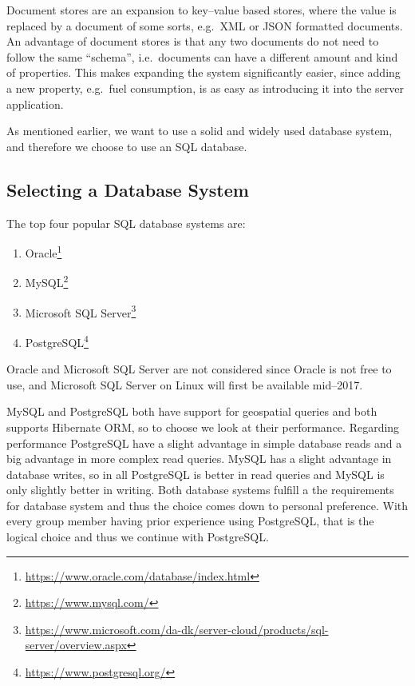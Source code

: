 Document stores are an expansion to key--value based stores, where the value is replaced by a document of some sorts, e.g.~XML or JSON formatted documents.
An advantage of document stores is that any two documents do not need to follow the same ``schema'', i.e.~documents can have a different amount and kind of properties.
This makes expanding the system significantly easier, since adding a new property, e.g.~fuel consumption, is as easy as introducing it into the server application.

\bigskip
As mentioned earlier, we want to use a solid and widely used database system, and therefore we choose to use an SQL database.

\subsection{Selecting a Database System}

The top four popular SQL database systems are\cite{DB_RANKINGS}: 
\begin{enumerate}
\item Oracle\footnote{\url{https://www.oracle.com/database/index.html}}
\item MySQL\footnote{\url{https://www.mysql.com/}}
\item Microsoft SQL Server\footnote{\url{https://www.microsoft.com/da-dk/server-cloud/products/sql-server/overview.aspx}}
\item PostgreSQL\footnote{\url{https://www.postgresql.org/}}
\end{enumerate}

Oracle and Microsoft SQL Server are not considered since Oracle is not free to use\cite{oracle_pricing}, 
and Microsoft SQL Server on Linux will first be available mid--2017\cite{ms_sql_linux}.

MySQL and PostgreSQL both have support for geospatial queries and both supports Hibernate ORM\cite{hibernate_support}, so to choose we look at their performance.
Regarding performance PostgreSQL have a slight advantage in simple database reads and a big advantage in more complex read queries.
MySQL has a slight advantage in database writes, 
so in all PostgreSQL is better in read queries and MySQL is only slightly better in writing\cite{post_vs_mysql}.
Both database systems fulfill a the requirements for database system and thus the choice comes down to personal preference.
With every group member having prior experience using PostgreSQL, that is the logical choice and thus we continue with PostgreSQL.

